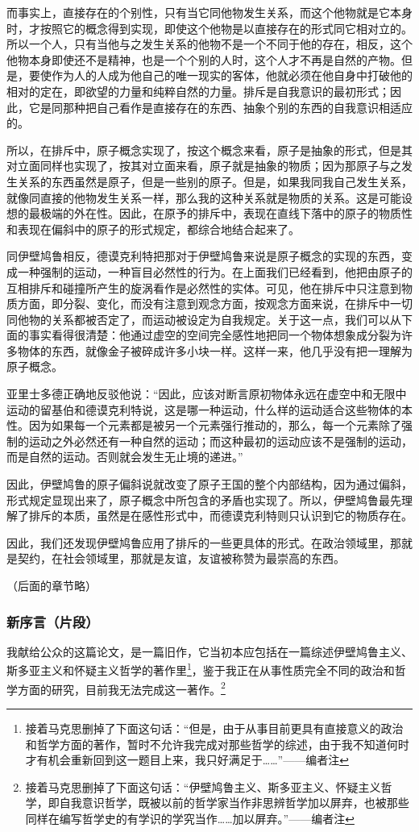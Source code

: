 \documentclass[a4paper,twoside,12pt,AutoFakeBold]{ctexart}
\begin{document}
而事实上，直接存在的个别性，只有当它同他物发生关系，而这个他物就是它本身时，才按照它的概念得到实现，即使这个他物是以直接存在的形式同它相对立的。所以一个人，只有当他与之发生关系的他物不是一个不同于他的存在，相反，这个他物本身即使还不是精神，也是一个个别的人时，这个人才不再是自然的产物。但是，要使作为人的人成为他自己的唯一现实的客体，他就必须在他自身中打破他的相对的定在，即欲望的力量和纯粹自然的力量。排斥是自我意识的最初形式；因此，它是同那种把自己看作是直接存在的东西、抽象个别的东西的自我意识相适应的。

所以，在排斥中，原子概念实现了，按这个概念来看，原子是抽象的形式，但是其对立面同样也实现了，按其对立面来看，原子就是抽象的物质；因为那原子与之发生关系的东西虽然是原子，但是一些别的原子。但是，如果我同我自己发生关系，就像同直接的他物发生关系一样，那么我的这种关系就是物质的关系。这是可能设想的最极端的外在性。因此，在原予的排斥中，表现在直线下落中的原子的物质性和表现在偏斜中的原子的形式规定，都综合地结合起来了。

同伊壁鸠鲁相反，德谟克利特把那对于伊壁鸠鲁来说是原子概念的实现的东西，变成一种强制的运动，一种盲目必然性的行为。在上面我们已经看到，他把由原子的互相排斥和碰撞所产生的旋涡看作是必然性的实体。可见，他在排斥中只注意到物质方面，即分裂、变化，而没有注意到观念方面，按观念方面来说，在排斥中一切同他物的关系都被否定了，而运动被设定为自我规定。关于这一点，我们可以从下面的事实看得很清楚：他通过虚空的空间完全感性地把同一个物体想象成分裂为许多物体的东西，就像金子被碎成许多小块一样。这样一来，他几乎没有把一理解为原子概念。

亚里士多德正确地反驳他说：“因此，应该对断言原初物体永远在虚空中和无限中运动的留基伯和德谟克利特说，这是哪一种运动，什么样的运动适合这些物体的本性。因为如果每一个元素都是被另一个元素强行推动的，那么，每一个元素除了强制的运动之外必然还有一种自然的运动；而这种最初的运动应该不是强制的运动，而是自然的运动。否则就会发生无止境的递进。”

因此，伊壁鸠鲁的原子偏斜说就改变了原子王国的整个内部结构，因为通过偏斜，形式规定显现出来了，原子概念中所包含的矛盾也实现了。所以，伊壁鸠鲁最先理解了排斥的本质，虽然是在感性形式中，而德谟克利特则只认识到它的物质存在。

因此，我们还发现伊壁鸠鲁应用了排斥的一些更具体的形式。在政治领域里，那就是契约，在社会领域里，那就是友谊，友谊被称赞为最崇高的东西。

（后面的章节略）
\subsubsection{新序言（片段）}
我献给公众的这篇论文，是一篇旧作，它当初本应包括在一篇综述伊壁鸠鲁主义、斯多亚主义和怀疑主义哲学的著作里\footnote{接着马克思删掉了下面这句话：“但是，由于从事目前更具有直接意义的政治和哲学方面的著作，暂时不允许我完成对那些哲学的综述，由于我不知道何时才有机会重新回到这一题目上来，我只好满足于……”——编者注}，鉴于我正在从事性质完全不同的政治和哲学方面的研究，目前我无法完成这一著作。\footnote{接着马克思删掉了下面这句话：“伊壁鸠鲁主义、斯多亚主义、怀疑主义哲学，即自我意识哲学，既被以前的哲学家当作非思辨哲学加以屏弃，也被那些同样在编写哲学史的有学识的学究当作……加以屏弃。”——编者注}
\end{document}
